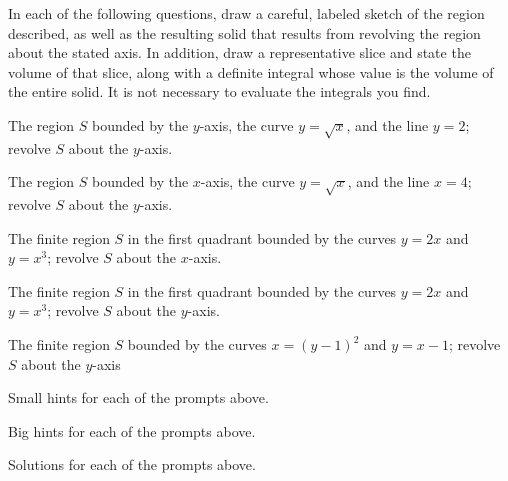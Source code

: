 \begin{activity} \label{A:6.2.2}  
In each of the following questions, draw a careful, labeled sketch of the region described, as well as the resulting solid that results from revolving the region about the stated axis.  In addition, draw a representative slice and state the volume of that slice, along with a definite integral whose value is the volume of the entire solid.  It is not necessary to evaluate the integrals you find.
\ba
	\item The region $S$ bounded by the $y$-axis, the curve $y = \sqrt{x}$, and the line $y = 2$; revolve $S$ about the $y$-axis.
	\item The region $S$ bounded by the $x$-axis, the curve $y = \sqrt{x}$, and the line $x = 4$; revolve $S$ about the $y$-axis.
	\item The finite region $S$ in the first quadrant bounded by the curves $y = 2x$ and $y = x^3$; revolve $S$ about the $x$-axis.	
	\item The finite region $S$ in the first quadrant bounded by the curves $y = 2x$ and $y = x^3$; revolve $S$ about the $y$-axis.
	\item The finite region $S$ bounded by the curves $x = (y-1)^2$ and $y  = x-1$; revolve $S$ about the $y$-axis
\ea

\end{activity}
\begin{smallhint}
\ba
	\item Small hints for each of the prompts above.
\ea
\end{smallhint}
\begin{bighint}
\ba
	\item Big hints for each of the prompts above.
\ea
\end{bighint}
\begin{activitySolution}
\ba
	\item Solutions for each of the prompts above.
\ea
\end{activitySolution}
\aftera
